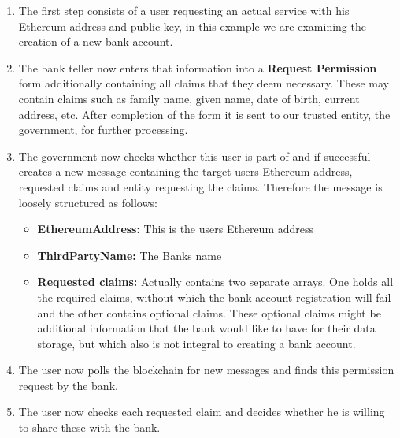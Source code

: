\begin{enumerate}
\item \label{permission_request_item_one}
The first step consists of a user requesting an actual service with his Ethereum address and public key, in this example we are examining the creation of a new bank account.
\begin{comment}
"An" goes before all words that begin with vowels:
An egg
With two exceptions:
When "u" makes the same sound as the "y" in you, or "o" makes the same sound as "w" in won, then "a" is used:
a union
a united front
a unicorn
a used napkin
a U.S. ship
a one-legged man
https://english.stackexchange.com/questions/105116/is-it-a-user-or-an-user
\end{comment}
\item \label{permission_request_item_two}
The bank teller now enters that information into a \textbf{Request Permission} form additionally containing all claims that they deem necessary. These may contain claims such as
family name, given name, date of birth, current address, etc. After completion of the form it is sent to our trusted entity, the government, for further processing.
\item \label{permission_request_item_three}
The government now checks whether this user is part of \projectName{} and if successful creates a new message containing the target users Ethereum address, requested claims and entity requesting the claims.
Therefore the message is loosely structured as follows:
\begin{itemize}
\item \textbf{EthereumAddress:} This is the users Ethereum address
\item \textbf{ThirdPartyName:} The Banks name
\item \textbf{Requested claims:} Actually contains two separate arrays.
One holds all the required claims, without which the bank account registration will fail and the other contains optional claims.
These optional claims might be additional information that the bank would like to have for their data storage, but which also is not integral to creating a bank account.
\end{itemize}
\item \label{permission_request_item_four}
The user now polls the blockchain for new messages and finds this permission request by the bank.
\item \label{permission_request_item_five}
The user now checks each requested claim and decides whether he is willing to share these with the bank.

\end{enumerate}
